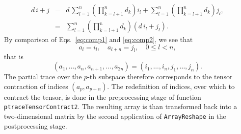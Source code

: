 \documentclass[nofootinbib,superscriptaddress,longbibliography,a4paper,amsfonts]{revtex4-2}
\begin{document}
\begin{eqnarray}
d \, i + j & = & d \, \sum_{l=1}^{n} \left( \prod_{k=l+1}^{n} d_k \right) i_l + \sum_{l=1}^{n} \left( \prod_{k=l+1}^{n} d_k \right) j_l, \\
& = & \sum_{l=1}^{n} \left( \prod_{k=l+1}^{n} d_k \right) (d \, i_l + j_l). \label{eq:comp2}
\end{eqnarray}
By comparison of Eqs.~\eqref{eq:comp1} and \eqref{eq:comp2}, we see that
\begin{equation}
    a_l = i_l, \quad a_{l+n} = j_l, \quad 0 \leq l < n,
\end{equation}
that is
\begin{equation}
    (a_1, \ldots, a_n, a_{n+1}, \ldots, a_{2n}) = (i_1, \ldots, i_n, j_1, \ldots, j_n).
\end{equation}
The partial trace over the $p$-th subspace therefore corresponds to the tensor contraction of indices $(a_p,a_{p+n})$. The redefinition of indices, over which to contract the tensor, is done in the preprocessing stage of function \verb+ptraceTensorContract2+. The resulting array is than transformed back into a two-dimensional matrix by the second application of \verb+ArrayReshape+ in the postprocessing stage.
\end{document}
